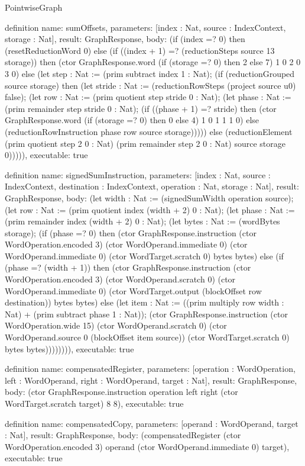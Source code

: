 \begin{lexlean}{PointwiseGraph}
\begin{semanticmodule}
definition{
  name: sumOffsets,
  parameters: [index : Nat, source : IndexContext, storage : Nat],
  result: GraphResponse,
  body: (if (index =? 0) then (resetReductionWord 0) else (if ((index + 1) =? (reductionSteps source 13 storage)) then (ctor GraphResponse.word (if (storage =? 0) then 2 else 7) 1 0 2 0 3 0) else (let step : Nat := (prim subtract index 1 : Nat); (if (reductionGrouped source storage) then (let stride : Nat := (reductionRowSteps (project source u0) false); (let row : Nat := (prim quotient step stride 0 : Nat); (let phase : Nat := (prim remainder step stride 0 : Nat); (if ((phase + 1) =? stride) then (ctor GraphResponse.word (if (storage =? 0) then 0 else 4) 1 0 1 1 1 0) else (reductionRowInstruction phase row source storage))))) else (reductionElement (prim quotient step 2 0 : Nat) (prim remainder step 2 0 : Nat) source storage 0))))),
  executable: true
}

definition{
  name: signedSumInstruction,
  parameters: [index : Nat, source : IndexContext, destination : IndexContext, operation : Nat, storage : Nat],
  result: GraphResponse,
  body: (let width : Nat := (signedSumWidth operation source);
    (let row : Nat := (prim quotient index (width + 2) 0 : Nat);
    (let phase : Nat := (prim remainder index (width + 2) 0 : Nat);
    (let bytes : Nat := (wordBytes storage);
      (if (phase =? 0) then
        (ctor GraphResponse.instruction (ctor WordOperation.encoded 3) (ctor WordOperand.immediate 0) (ctor WordOperand.immediate 0) (ctor WordTarget.scratch 0) bytes bytes)
       else (if (phase =? (width + 1)) then
        (ctor GraphResponse.instruction (ctor WordOperation.encoded 3) (ctor WordOperand.scratch 0) (ctor WordOperand.immediate 0) (ctor WordTarget.output (blockOffset row destination)) bytes bytes)
       else (let item : Nat := ((prim multiply row width : Nat) + (prim subtract phase 1 : Nat));
        (ctor GraphResponse.instruction (ctor WordOperation.wide 15) (ctor WordOperand.scratch 0) (ctor WordOperand.source 0 (blockOffset item source)) (ctor WordTarget.scratch 0) bytes bytes)))))))),
  executable: true
}

definition{
  name: compensatedRegister,
  parameters: [operation : WordOperation, left : WordOperand, right : WordOperand, target : Nat],
  result: GraphResponse,
  body: (ctor GraphResponse.instruction operation left right (ctor WordTarget.scratch target) 8 8),
  executable: true
}

definition{
  name: compensatedCopy,
  parameters: [operand : WordOperand, target : Nat],
  result: GraphResponse,
  body: (compensatedRegister (ctor WordOperation.encoded 3) operand (ctor WordOperand.immediate 0) target),
  executable: true
}


\end{semanticmodule}
\end{lexlean}

